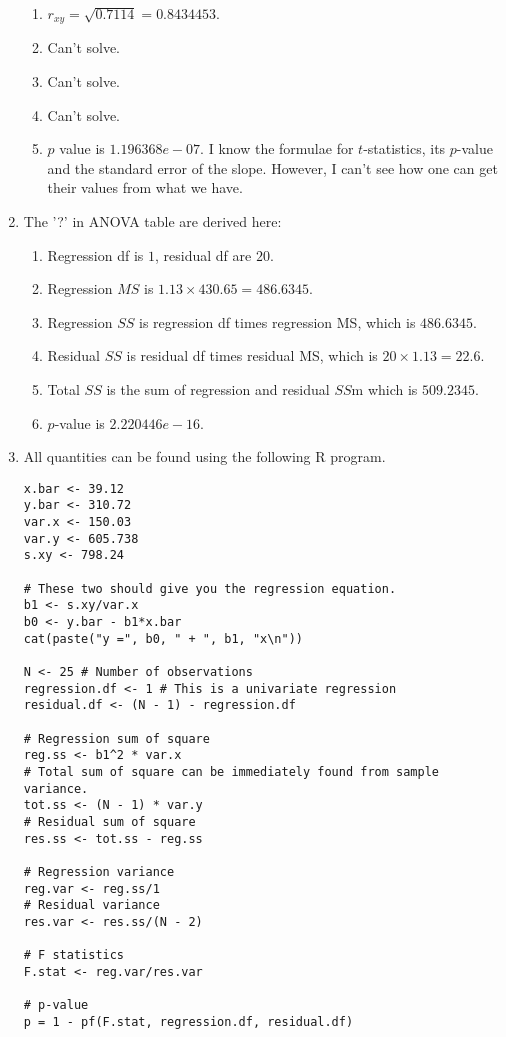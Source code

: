 \documentclass{article}
\begin{document}
\begin{enumerate}
\begin{enumerate}
\item $r_{xy} = \sqrt{0.7114} = 0.8434453$.
\item Can't solve.
\item Can't solve.
\item Can't solve.
\item $p$ value is $1.196368e-07$.
I know the formulae for $t$-statistics, its $p$-value and the standard error of the slope.
However, I can't see how one can get their values from what we have.
\end{enumerate}
\item The '?' in ANOVA table are derived here:
\begin{enumerate}
\item Regression df is $1$, residual df are $20$.
\item Regression $MS$ is $1.13 \times 430.65 = 486.6345$.
\item Regression $SS$ is regression df times regression MS, which is $486.6345$.
\item Residual $SS$ is residual df times residual MS, which is $20 \times 1.13 = 22.6$.
\item Total $SS$ is the sum of regression and residual $SS$m which is $509.2345$.
\item $p$-value is $2.220446e-16$.
\end{enumerate}

\item All quantities can be found using the following R program.
\begin{verbatim}
x.bar <- 39.12
y.bar <- 310.72
var.x <- 150.03
var.y <- 605.738
s.xy <- 798.24

# These two should give you the regression equation.
b1 <- s.xy/var.x
b0 <- y.bar - b1*x.bar
cat(paste("y =", b0, " + ", b1, "x\n"))

N <- 25 # Number of observations
regression.df <- 1 # This is a univariate regression
residual.df <- (N - 1) - regression.df

# Regression sum of square
reg.ss <- b1^2 * var.x
# Total sum of square can be immediately found from sample variance.
tot.ss <- (N - 1) * var.y
# Residual sum of square
res.ss <- tot.ss - reg.ss

# Regression variance
reg.var <- reg.ss/1
# Residual variance
res.var <- res.ss/(N - 2)

# F statistics
F.stat <- reg.var/res.var

# p-value
p = 1 - pf(F.stat, regression.df, residual.df)


\end{verbatim}
\end{enumerate}
\end{document}
